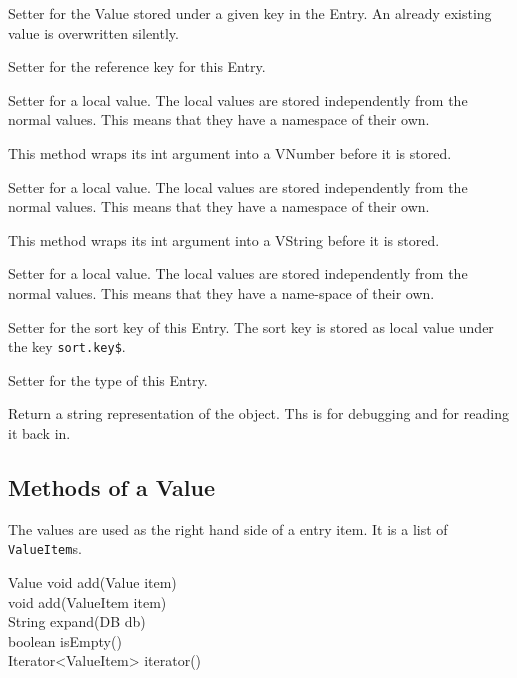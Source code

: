 \begin{methods}
    Setter for the Value stored under a given key in the Entry. An already
    existing value is overwritten silently.

    Setter for the reference key for this Entry.

     Setter for a local value. The local values are stored independently from
     the normal values. This means that they have a namespace of their own.

    This method wraps its int argument into a VNumber before it is stored.

     Setter for a local value. The local values are stored independently from
     the normal values. This means that they have a namespace of their own.

     This method wraps its int argument into a VString before it is stored.

    Setter for a local value. The local values are stored independently
    from the normal values. This means that they have a name-space of
    their own.

    Setter for the sort key of this Entry. The sort key is stored as
    local value under the key \texttt{sort.key\$}.

    Setter for the type of this Entry.

    Return a string representation of the object. Ths is for debugging
    and for reading it back in.
\end{methods}

\subsection{Methods of a Value}\label{sec:groovy.value}

The values are used as the right hand side of a entry item. It is a list of
\texttt{ValueItem}s.

\begin{UMLclass}{Value}
  void add(Value item)\\
  void add(ValueItem item)\\
  String expand(DB db)\\
  boolean isEmpty()\\
  Iterator<ValueItem> iterator()  
\end{UMLclass}

